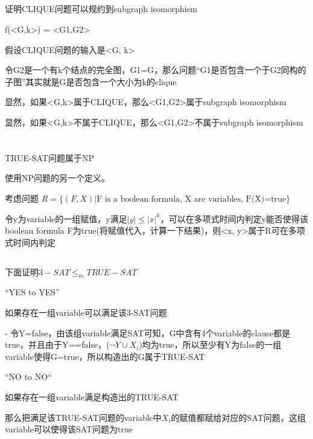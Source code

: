 \documentclass{zpt}
\begin{document}
\subsection{}
证明CLIQUE问题可以规约到subgraph isomorphism

f(<G,k>) = <G1,G2>

假设CLIQUE问题的输入是<G, k>

令G2是一个有k个结点的完全图，G1=G，那么问题“G1是否包含一个于G2同构的子图”其实就是G是否包含一个大小为k的clique

显然，如果<G,k>属于CLIQUE，那么<G1,G2>属于subgraph isomorphism

显然，如果<G,k>不属于CLIQUE，那么<G1,G2>不属于subgraph isomorphism

\section{}
\subsection{}
TRUE-SAT问题属于NP

使用NP问题的另一个定义。

考虑问题 $R=\{(F,X)|\text{F is a boolean formula, X are variables, F(X)=true}\}$

令y为variable的一组赋值，y满足$|y|\le |x|^k$，可以在多项式时间内判定y能否使得该boolean formula F为true(将赋值代入，计算一下结果)，则<x, y>属于R可在多项式时间内判定

\subsection{}
下面证明$3-SAT\le_m TRUE-SAT$

 “YES to YES”

如果存在一组variable可以满足该3-SAT问题

- 令Y=false，由该组variable满足SAT可知，G中含有4个variable的clause都是true，并且由于Y==false，($\neg Y\cup X_i$)均为true，所以至少有Y为false的一组variable使得G=true，所以构造出的G属于TRUE-SAT

“NO to NO“

如果存在一组variable满足构造出的TRUE-SAT

那么把满足该TRUE-SAT问题的variable中$X_i$的赋值都赋给对应的SAT问题，这组variable可以使得该SAT问题为true

\section{}
\end{document}
